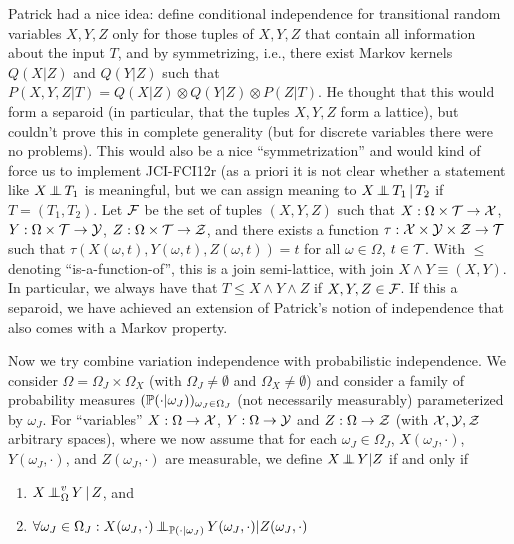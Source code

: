 Patrick had a nice idea: define conditional independence for transitional random variables $X,Y,Z$ only for those tuples of $X,Y,Z$ that contain all information about the input $T$, and by symmetrizing, i.e., there exist Markov kernels $Q(X|Z)$ and $Q(Y|Z)$ such that $P(X,Y,Z|T) = Q(X|Z) \otimes Q(Y|Z) \otimes P(Z|T)$. He thought that this would form a separoid (in particular, that the tuples $X,Y,Z$ form a lattice), but couldn't prove this in complete generality (but for discrete variables there were no problems).
This would also be a nice ``symmetrization'' and would kind of force us to implement JCI-FCI12r (as a priori it is not clear whether a statement like $X \operatorname*{\perp\mkern-11mu\perp} T_1$ is meaningful, but we can assign meaning to $X \operatorname*{\perp\mkern-11mu\perp} T_1 \operatorname*{|} T_2$ if $T = (T_1,T_2)$.
Let $\mathcal{F}$ be the set of tuples $(X,Y,Z)$ such that $X : \Omega \times \mathcal{T} \to \mathcal{X}$, $Y : \Omega \times \mathcal{T} \to \mathcal{Y}$, $Z : \Omega \times \mathcal{T} \to \mathcal{Z}$, and there exists a function $\tau : \mathcal{X} \times \mathcal{Y} \times \mathcal{Z} \to \mathcal{T}$ such that $\tau(X(\omega,t),Y(\omega,t),Z(\omega,t)) = t$ for all $\omega \in \Omega$, $t \in \mathcal{T}$.
With $\le$ denoting ``is-a-function-of'', this is a join semi-lattice, with join $X \wedge Y \equiv (X,Y)$.
In particular, we always have that $T \le X \wedge Y \wedge Z$ if $X, Y, Z \in \mathcal{F}$.
If this a separoid, we have achieved an extension of Patrick's notion of independence that also comes with a Markov property.

Now we try combine variation independence with probabilistic independence. We consider
$\Omega = \Omega_J \times \Omega_X$ (with $\Omega_J \ne \emptyset$ and $\Omega_X \ne \emptyset$) and consider a family of probability measures
$(\mathbb{P}( \cdot | \omega_J))_{\omega_J \in \Omega_J}$ (not necessarily measurably) parameterized by $\omega_J$.
For ``variables'' 
$X : \Omega \to \mathcal{X}$, $Y : \Omega \to \mathcal{Y}$ and $Z : \Omega \to \mathcal{Z}$ (with $\mathcal{X},\mathcal{Y},\mathcal{Z}$ arbitrary spaces), where
we now assume that for each $\omega_J \in \Omega_J$, $X(\omega_J,\cdot)$, $Y(\omega_J,\cdot)$, and $Z(\omega_J,\cdot)$ are measurable, we define
$X \operatorname*{\perp\mkern-11mu\perp} Y | Z$ if and only if
\begin{enumerate}
  \item $X \operatorname*{\perp\mkern-11mu\perp}^v_\Omega Y \operatorname*{|} Z$, and
  \item $\forall \omega_J \in \Omega_J: X(\omega_J,\cdot) \operatorname*{\perp\mkern-11mu\perp}_{\mathbb{P}(\cdot|\omega_J)} Y(\omega_J,\cdot) | Z(\omega_J,\cdot)$
\end{enumerate}


